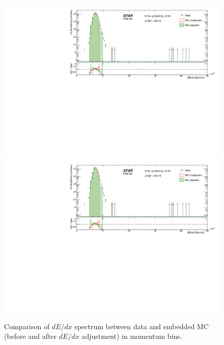 \begin{figure}[ht]
\centering%
\caption[Comparison of $dE/dx$ spectrum between data and embedded MC in momentum bins.]{Comparison of $dE/dx$ spectrum between data and embedded MC (before and after $dE/dx$ adjustment) in momentum bins.}\label{fig:dEdxDataVsMC}
\parbox{0.495\textwidth}{
  \centering
  \includegraphics[width=\linewidth,page=2]{graphics/dedx/dEdx_DataVsMC.pdf}\\[3pt]
  \includegraphics[width=\linewidth,page=4]{graphics/dedx/dEdx_DataVsMC.pdf}\\[3pt]
}
\end{figure}
